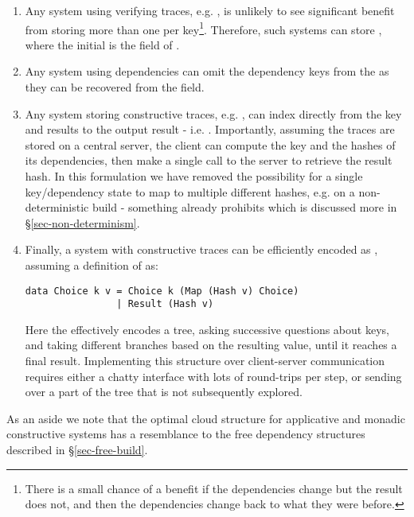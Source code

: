 \begin{enumerate}
\item Any system using verifying traces, e.g. \Shake, is unlikely to see significant benefit from storing more than one  per key\footnote{There is a small chance of a benefit if the dependencies change but the result does not, and then the dependencies change back to what they were before.}. Therefore, such systems can store , where the initial  is the  field of .
\item Any system using  dependencies can omit the dependency keys from the  as they can be recovered from the  field.
\item Any  system storing constructive traces, e.g. \Bazel, can index directly from the key and results to the output result - i.e. . Importantly, assuming the traces are stored on a central server, the client can compute the key and the hashes of its dependencies, then make a single call to the server to retrieve the result hash. In this formulation we have removed the possibility for a single key/dependency state to map to multiple different hashes, e.g. on a non-deterministic build - something \Bazel already prohibits which is discussed more in \S\ref{sec-non-determinism}.
\item Finally, a  system with constructive traces can be efficiently encoded as , assuming a definition of  as:
\begin{verbatim}
data Choice k v = Choice k (Map (Hash v) Choice)
                | Result (Hash v)
\end{verbatim}
Here the  effectively encodes a tree, asking successive questions about keys, and taking different branches based on the resulting value, until it reaches a final result. Implementing this structure over client-server communication requires either a chatty interface with lots of round-trips per  step, or sending over a part of the tree that is not subsequently explored.
\end{enumerate}

As an aside we note that the optimal cloud structure for applicative and monadic constructive systems has a resemblance to the free dependency structures described in \S\ref{sec-free-build}.

